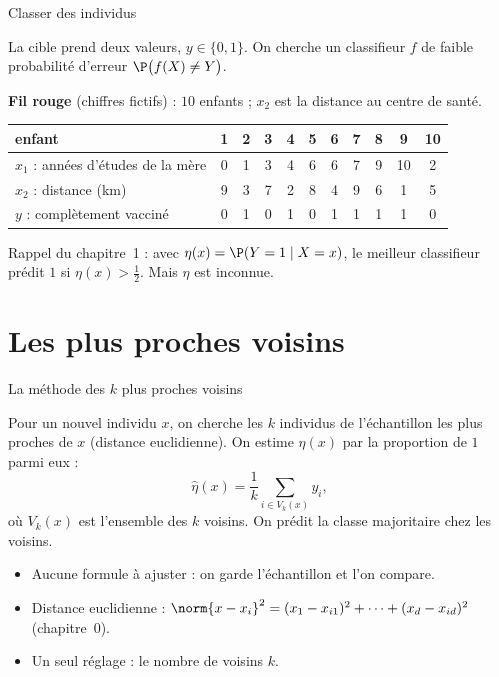 \documentclass[aspectratio=169,11pt]{beamer}
\begin{document}
\begin{frame}{Classer des individus}
  \begin{definition}
    La cible prend deux valeurs, $y\in\{0,1\}$. On cherche un classifieur $f$ de faible probabilité d'erreur $\P\big(f(X)\ne Y\big)$.
  \end{definition}
  \vskip2mm
  {\small\textbf{Fil rouge} (chiffres fictifs) : $10$ enfants ; $x_2$ est la distance au centre de santé.}
  \vskip1mm
  \begin{center}
    \small\renewcommand{\arraystretch}{1.1}
    \begin{tabular}{lcccccccccc}
      \toprule
      enfant & 1 & 2 & 3 & 4 & 5 & 6 & 7 & 8 & 9 & 10 \\
      \midrule
      $x_1$ : années d'études de la mère & 0 & 1 & 3 & 4 & 6 & 6 & 7 & 9 & 10 & 2 \\
      $x_2$ : distance (km) & 9 & 3 & 7 & 2 & 8 & 4 & 9 & 6 & 1 & 5 \\
      $y$ : complètement vacciné & 0 & 1 & 0 & 1 & 0 & 1 & 1 & 1 & 1 & 0 \\
      \bottomrule
    \end{tabular}
  \end{center}
  {\small\color{cnfGris}Rappel du chapitre~1 : avec $\eta(x)=\P(Y=1\mid X=x)$, le meilleur classifieur prédit $1$ si $\eta(x)>\frac12$. Mais $\eta$ est inconnue.}
\end{frame}

\section{Les plus proches voisins}

\begin{frame}{La méthode des $k$ plus proches voisins}
  \begin{definition}
    Pour un nouvel individu $x$, on cherche les $k$ individus de l'échantillon les plus proches de $x$ (distance euclidienne). On estime $\eta(x)$ par la proportion de $1$ parmi eux :
    \[
      \hat\eta(x)=\frac1k\sum_{i\in V_k(x)}y_i ,
    \]
    où $V_k(x)$ est l'ensemble des $k$ voisins. On prédit la classe majoritaire chez les voisins.
  \end{definition}
  \begin{itemize}\small
    \item Aucune formule à ajuster : on garde l'échantillon et l'on compare.
    \item Distance euclidienne : $\norm{x-x_i}^2=(x_1-x_{i1})^2+\dots+(x_d-x_{id})^2$ (chapitre~0).
    \item Un seul réglage : le nombre de voisins $k$.
  \end{itemize}
\end{frame}
\end{document}
